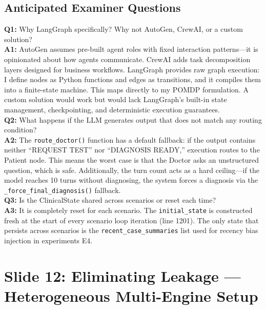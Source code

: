 \documentclass[12pt]{article}
\begin{document}
  \subsection*{Anticipated Examiner Questions}
  \begin{qabox}
  \textbf{Q1:} Why LangGraph specifically? Why not AutoGen, CrewAI, or a custom solution? \\
  \textbf{A1:} AutoGen assumes pre-built agent roles with fixed interaction patterns---it is opinionated about how agents communicate. CrewAI adds task decomposition layers designed for business workflows. LangGraph provides raw graph execution: I define nodes as Python functions and edges as transitions, and it compiles them into a finite-state machine. This maps directly to my POMDP formulation. A custom solution would work but would lack LangGraph's built-in state management, checkpointing, and deterministic execution guarantees. \\[6pt]
  \textbf{Q2:} What happens if the LLM generates output that does not match any routing condition? \\
  \textbf{A2:} The \texttt{route\_doctor()} function has a default fallback: if the output contains neither ``REQUEST TEST'' nor ``DIAGNOSIS READY,'' execution routes to the Patient node. This means the worst case is that the Doctor asks an unstructured question, which is safe. Additionally, the turn count acts as a hard ceiling---if the model reaches 10 turns without diagnosing, the system forces a diagnosis via the \texttt{\_force\_final\_diagnosis()} fallback. \\[6pt]
  \textbf{Q3:} Is the ClinicalState shared across scenarios or reset each time? \\
  \textbf{A3:} It is completely reset for each scenario. The \texttt{initial\_state} is constructed fresh at the start of every scenario loop iteration (line 1201). The only state that persists across scenarios is the \texttt{recent\_case\_summaries} list used for recency bias injection in experiments E4.
  \end{qabox}


  \section{Slide 12: Eliminating Leakage --- Heterogeneous Multi-Engine Setup}
\end{document}
